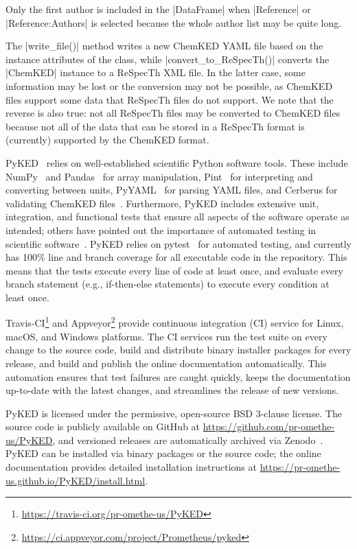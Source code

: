 \documentclass[12pt]{ijck}
\newcommand\ck{ChemKED}
\newcommand\pk{PyKED}
\begin{document}
Only the first author is included in the \pybox|DataFrame| when \pybox|Reference| or
\pybox|Reference:Authors| is selected because the whole author list may be
quite long.

The \pybox|write_file()| method writes a new \ck{} YAML file based on the instance attributes
of the class, while \pybox|convert_to_ReSpecTh()| converts the \pybox|ChemKED|
instance to a ReSpecTh XML file. In the latter case, some information may be lost or the conversion
may not be possible, as \ck{} files support some data that ReSpecTh files do not support. We note
that the reverse is also true: not all ReSpecTh files may be converted to \ck{} files because not
all of the data that can be stored in a ReSpecTh format is (currently) supported by the \ck{} format.

\pk{}~\autocite{PyKED} relies on well-established scientific Python software tools.
These include NumPy~\autocite{vanderWalt:2011np} and Pandas~\autocite{pandas,McKinney2010}
for array manipulation, Pint~\autocite{Grecco2016} for interpreting and converting
between units, PyYAML~\autocite{pyyaml} for parsing YAML
files, and Cerberus for validating \ck{} files~\autocite{cerberus}.
Furthermore, \pk{} includes extensive unit, integration, and functional tests
that ensure all aspects of the software operate as intended; others have pointed
out the importance of automated testing in scientific software~\autocite{Wilson:bestpractices}.
\pk{} relies on pytest~\autocite{pytest:3.0.1} for automated testing, and currently has
100\% line and branch coverage for all executable code in the repository. This
means that the tests execute every line of code at least once, and evaluate
every branch statement (e.g., if-then-else statements) to execute every condition
at least once.

Travis-CI\footnote{\url{https://travis-ci.org/pr-omethe-us/PyKED}} and
Appveyor\footnote{\url{https://ci.appveyor.com/project/Prometheus/pyked}} provide continuous
integration (CI) service for Linux, macOS, and Windows platforms. The CI services run the test suite
on every change to the source code, build and distribute binary installer packages for every
release, and build and publish the online documentation automatically. This automation ensures that
test failures are caught quickly, keeps the documentation up-to-date with the latest changes, and
streamlines the release of new versions.

\pk{} is licensed under the permissive, open-source BSD 3-clause license. The
source code is publicly available on GitHub at \url{https://github.com/pr-omethe-us/PyKED},
and versioned releases are automatically archived via Zenodo~\autocite{PyKED}.
\pk{} can be installed via binary packages or the source code; the online documentation
provides detailed installation instructions at
\url{https://pr-omethe-us.github.io/PyKED/install.html}.
\end{document}
